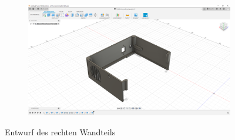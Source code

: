 \begin{figure}[h!tb]
\begin{subfigure}[t]{.3\linewidth}
		\caption[]{}
		\label{fig:design-right-15}
	\end{subfigure}
	\begin{subfigure}[t]{.3\linewidth}
		\includegraphics[width=\linewidth]{img/konstruktion_gehaeuse_rechts_016.png}
		\caption[]{}
		\label{fig:design-right-16}
	\end{subfigure}
	\caption[Entwurf des rechten Wandteils]{Entwurf des rechten Wandteils}
	\label{fig:design-right}
\end{figure}\par
